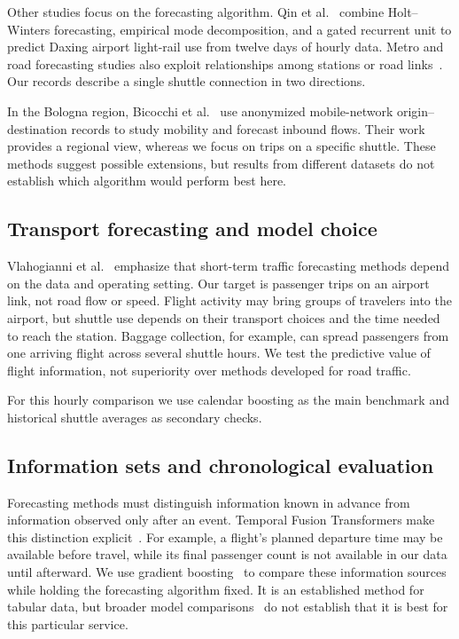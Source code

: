 \documentclass[preprint,12pt,times]{elsarticle}
\begin{document}
Other studies focus on the forecasting algorithm. Qin et al.~\cite{qin} combine Holt--Winters forecasting, empirical mode decomposition, and a gated recurrent unit to predict Daxing airport light-rail use from twelve days of hourly data. Metro and road forecasting studies also exploit relationships among stations or road links~\cite{reslstm,dcrnn,stgcn}. Our records describe a single shuttle connection in two directions.

In the Bologna region, Bicocchi et al.~\cite{bicocchi2026flows} use anonymized mobile-network origin--destination records to study mobility and forecast inbound flows. Their work provides a regional view, whereas we focus on trips on a specific shuttle. These methods suggest possible extensions, but results from different datasets do not establish which algorithm would perform best here.

\subsection{Transport forecasting and model choice}
Vlahogianni et al.~\cite{trafficreview} emphasize that short-term traffic forecasting methods depend on the data and operating setting. Our target is passenger trips on an airport link, not road flow or speed. Flight activity may bring groups of travelers into the airport, but shuttle use depends on their transport choices and the time needed to reach the station. Baggage collection, for example, can spread passengers from one arriving flight across several shuttle hours. We test the predictive value of flight information, not superiority over methods developed for road traffic.

For this hourly comparison we use calendar boosting as the main benchmark and historical shuttle averages as secondary checks.

\subsection{Information sets and chronological evaluation}
Forecasting methods must distinguish information known in advance from information observed only after an event. Temporal Fusion Transformers make this distinction explicit~\cite{tft}. For example, a flight's planned departure time may be available before travel, while its final passenger count is not available in our data until afterward. We use gradient boosting~\cite{friedman} to compare these information sources while holding the forecasting algorithm fixed. It is an established method for tabular data, but broader model comparisons~\cite{tabular} do not establish that it is best for this particular service.
\end{document}

